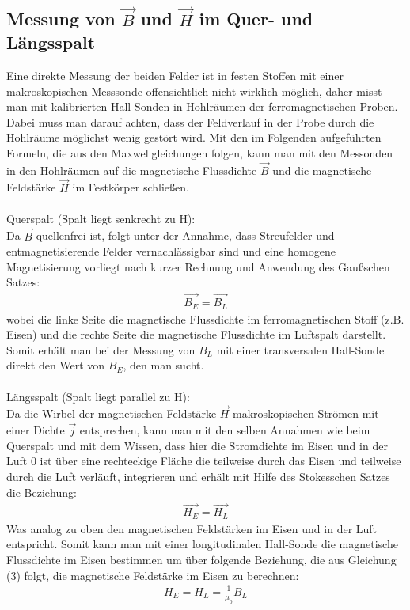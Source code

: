 \documentclass[a4paper,10pt]{scrartcl}
\begin{document}
	\subsection{Messung von \(\vec{B}\) und \(\vec{H}\) im Quer- und Längsspalt}
	
		Eine direkte Messung der beiden Felder ist in festen Stoffen mit einer makroskopischen Messsonde offensichtlich nicht wirklich möglich, daher misst man mit kalibrierten Hall-Sonden in Hohlräumen der ferromagnetischen Proben. Dabei muss man darauf achten, dass der Feldverlauf in der Probe durch die Hohlräume möglichst wenig gestört wird. Mit den im Folgenden aufgeführten Formeln, die aus den Maxwellgleichungen folgen, kann man mit den Messonden in den Hohlräumen auf die magnetische Flussdichte \(\vec{B}\) und die magnetische Feldstärke \(\vec{H}\) im Festkörper schließen.\\
		\\
		Querspalt (Spalt liegt senkrecht zu H):\\
		Da \(\vec{B}\) quellenfrei ist, folgt unter der Annahme, dass Streufelder und entmagnetisierende Felder vernachlässigbar sind und eine homogene Magnetisierung vorliegt nach kurzer Rechnung und Anwendung des Gaußschen Satzes:
		\begin{align}
		\vec{B_{E}}=\vec{B_{L}}
		\end{align}
		wobei die linke Seite die magnetische Flussdichte im ferromagnetischen Stoff (z.B. Eisen) und die rechte Seite die magnetische Flussdichte im Luftspalt darstellt. Somit erhält man bei der Messung von \(B_{L}\) mit einer transversalen Hall-Sonde direkt den Wert von \(B_{E}\), den man sucht.\\
		\\
		Längsspalt (Spalt liegt parallel zu H):\\
		Da die Wirbel der magnetischen Feldstärke \(\vec{H}\) makroskopischen Strömen mit einer Dichte \(\vec{j}\) entsprechen, kann man mit den selben Annahmen wie beim Querspalt und mit dem Wissen, dass hier die Stromdichte im Eisen und in der Luft 0 ist über eine rechteckige Fläche die teilweise durch das Eisen und teilweise durch die Luft verläuft, integrieren und erhält mit Hilfe des Stokesschen Satzes die Beziehung:
		\begin{align}
		\vec{H_{E}}=\vec{H_{L}}
		\end{align}
		Was analog zu oben den magnetischen Feldstärken im Eisen und in der Luft entspricht. Somit kann man mit einer longitudinalen Hall-Sonde die magnetische Flussdichte im Eisen bestimmen um über folgende Beziehung, die aus Gleichung (3) folgt, die magnetische Feldstärke im Eisen zu berechnen:
		\begin{align}
		H_{E}=H_{L}=\frac{1}{\mu_{0}}B_{L}
		\end{align}
		
\end{document}

